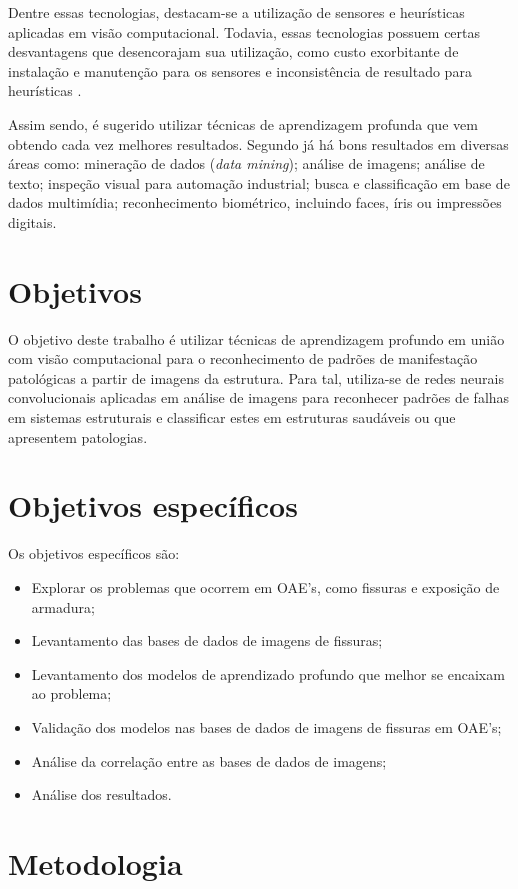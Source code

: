 Dentre essas tecnologias, destacam-se a utilização de sensores e heurísticas aplicadas em visão computacional. 
Todavia, essas tecnologias possuem certas desvantagens que desencorajam sua utilização, como custo exorbitante de instalação e manutenção para os sensores e inconsistência de resultado para heurísticas \cite{Zhuang2022}.

Assim sendo, é sugerido utilizar técnicas de aprendizagem profunda que vem obtendo cada vez melhores resultados.
Segundo  já há bons resultados em diversas áreas como: mineração de dados (\textit{data mining}); análise de imagens; análise de texto; inspeção visual para automação industrial; busca e classificação em base de dados multimídia; reconhecimento biométrico, incluindo faces, íris ou impressões digitais.

\section{Objetivos}
O objetivo deste trabalho é utilizar técnicas de aprendizagem profundo em união com visão computacional para o reconhecimento de padrões de manifestação patológicas a partir de imagens da estrutura.
Para tal, utiliza-se de redes neurais convolucionais aplicadas em análise de imagens para reconhecer padrões de falhas em sistemas estruturais e classificar estes em estruturas saudáveis ou que apresentem  patologias.

\section{Objetivos específicos}
Os objetivos específicos são:

\begin{itemize}
    \item Explorar os problemas que ocorrem em OAE's, como fissuras e exposição de armadura;
    \item Levantamento das bases de dados de imagens de fissuras;
    \item Levantamento dos modelos de aprendizado profundo que melhor se encaixam ao problema;
    \item Validação dos modelos nas bases de dados de imagens de fissuras em OAE's;
    \item Análise da correlação entre as bases de dados de imagens;
    \item Análise dos resultados.
\end{itemize}


\section{Metodologia}

